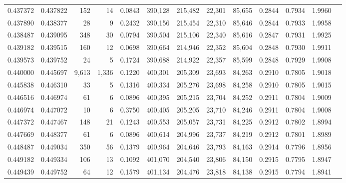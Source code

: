 \begin{tabular}{rrrrrrrrrrrrr}
0.437372 & 0.437822 &    152 &    14 &                                     0.0843 & 390,128 & 215,482 &  22,301 &  85,655 & 0.2844 & 0.7934 & 1.9960 \\
0.437890 & 0.438377 &     28 &     9 &                                     0.2432 & 390,156 & 215,454 &  22,310 &  85,646 & 0.2844 & 0.7933 & 1.9958 \\
0.438487 & 0.439095 &    348 &    30 &                                     0.0794 & 390,504 & 215,106 &  22,340 &  85,616 & 0.2847 & 0.7931 & 1.9925 \\
0.439182 & 0.439515 &    160 &    12 &                                     0.0698 & 390,664 & 214,946 &  22,352 &  85,604 & 0.2848 & 0.7930 & 1.9911 \\
0.439573 & 0.439752 &     24 &     5 &                                     0.1724 & 390,688 & 214,922 &  22,357 &  85,599 & 0.2848 & 0.7929 & 1.9908 \\
0.440000 & 0.445697 &  9,613 & 1,336 &                                     0.1220 & 400,301 & 205,309 &  23,693 &  84,263 & 0.2910 & 0.7805 & 1.9018 \\
0.445838 & 0.446310 &     33 &     5 &                                     0.1316 & 400,334 & 205,276 &  23,698 &  84,258 & 0.2910 & 0.7805 & 1.9015 \\
0.446516 & 0.446974 &     61 &     6 &                                     0.0896 & 400,395 & 205,215 &  23,704 &  84,252 & 0.2911 & 0.7804 & 1.9009 \\
0.446974 & 0.447072 &     10 &     6 &                                     0.3750 & 400,405 & 205,205 &  23,710 &  84,246 & 0.2911 & 0.7804 & 1.9008 \\
0.447372 & 0.447467 &    148 &    21 &                                     0.1243 & 400,553 & 205,057 &  23,731 &  84,225 & 0.2912 & 0.7802 & 1.8994 \\
0.447669 & 0.448377 &     61 &     6 &                                     0.0896 & 400,614 & 204,996 &  23,737 &  84,219 & 0.2912 & 0.7801 & 1.8989 \\
0.448487 & 0.449034 &    350 &    56 &                                     0.1379 & 400,964 & 204,646 &  23,793 &  84,163 & 0.2914 & 0.7796 & 1.8956 \\
0.449182 & 0.449334 &    106 &    13 &                                     0.1092 & 401,070 & 204,540 &  23,806 &  84,150 & 0.2915 & 0.7795 & 1.8947 \\
0.449439 & 0.449752 &     64 &    12 &                                     0.1579 & 401,134 & 204,476 &  23,818 &  84,138 & 0.2915 & 0.7794 & 1.8941 \\

\end{tabular}
